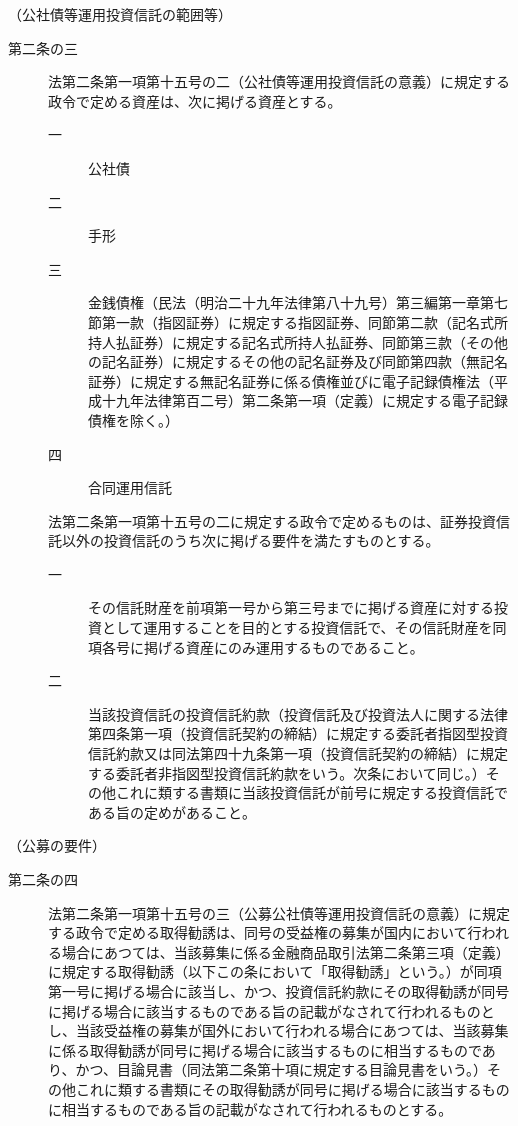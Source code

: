 \documentclass[twocolumn,a4j,10pt]{ltjtarticle}
\begin{document}
\noindent\hspace{10pt}（公社債等運用投資信託の範囲等）
\begin{description}
\item[第二条の三]法第二条第一項第十五号の二（公社債等運用投資信託の意義）に規定する政令で定める資産は、次に掲げる資産とする。
\begin{description}
\item[一]公社債
\item[二]手形
\item[三]金銭債権（民法（明治二十九年法律第八十九号）第三編第一章第七節第一款（指図証券）に規定する指図証券、同節第二款（記名式所持人払証券）に規定する記名式所持人払証券、同節第三款（その他の記名証券）に規定するその他の記名証券及び同節第四款（無記名証券）に規定する無記名証券に係る債権並びに電子記録債権法（平成十九年法律第百二号）第二条第一項（定義）に規定する電子記録債権を除く。）
\item[四]合同運用信託
\end{description}
\item[]法第二条第一項第十五号の二に規定する政令で定めるものは、証券投資信託以外の投資信託のうち次に掲げる要件を満たすものとする。
\begin{description}
\item[一]その信託財産を前項第一号から第三号までに掲げる資産に対する投資として運用することを目的とする投資信託で、その信託財産を同項各号に掲げる資産にのみ運用するものであること。
\item[二]当該投資信託の投資信託約款（投資信託及び投資法人に関する法律第四条第一項（投資信託契約の締結）に規定する委託者指図型投資信託約款又は同法第四十九条第一項（投資信託契約の締結）に規定する委託者非指図型投資信託約款をいう。次条において同じ。）その他これに類する書類に当該投資信託が前号に規定する投資信託である旨の定めがあること。
\end{description}
\end{description}
\noindent\hspace{10pt}（公募の要件）
\begin{description}
\item[第二条の四]法第二条第一項第十五号の三（公募公社債等運用投資信託の意義）に規定する政令で定める取得勧誘は、同号の受益権の募集が国内において行われる場合にあつては、当該募集に係る金融商品取引法第二条第三項（定義）に規定する取得勧誘（以下この条において「取得勧誘」という。）が同項第一号に掲げる場合に該当し、かつ、投資信託約款にその取得勧誘が同号に掲げる場合に該当するものである旨の記載がなされて行われるものとし、当該受益権の募集が国外において行われる場合にあつては、当該募集に係る取得勧誘が同号に掲げる場合に該当するものに相当するものであり、かつ、目論見書（同法第二条第十項に規定する目論見書をいう。）その他これに類する書類にその取得勧誘が同号に掲げる場合に該当するものに相当するものである旨の記載がなされて行われるものとする。
\end{description}
\end{document}
